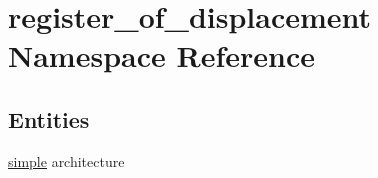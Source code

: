 \hypertarget{namespaceregister__of__displacement}{}\section{register\+\_\+of\+\_\+displacement Namespace Reference}
\label{namespaceregister__of__displacement}
\subsection*{Entities}
\begin{DoxyCompactItemize}
\item 
\hyperlink{classregister__of__displacement_1_1simple}{simple} architecture
\end{DoxyCompactItemize}
